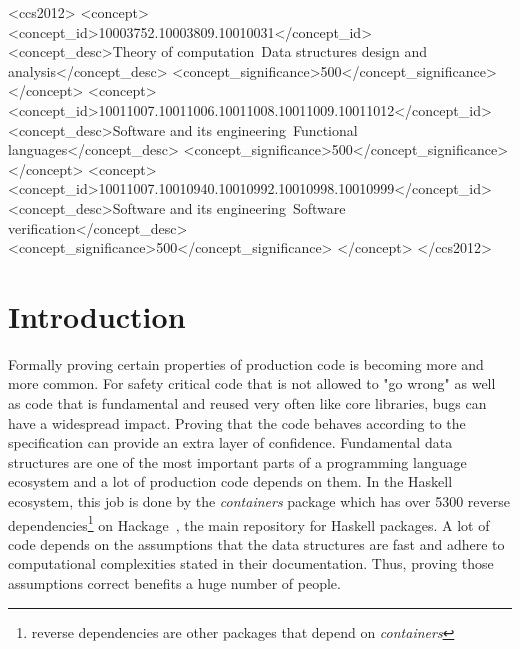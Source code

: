 \documentclass[sigplan,screen,review,anonymous]{acmart}
\begin{document}
\begin{CCSXML}
<ccs2012>
   <concept>
       <concept_id>10003752.10003809.10010031</concept_id>
       <concept_desc>Theory of computation~Data structures design and analysis</concept_desc>
       <concept_significance>500</concept_significance>
       </concept>
   <concept>
       <concept_id>10011007.10011006.10011008.10011009.10011012</concept_id>
       <concept_desc>Software and its engineering~Functional languages</concept_desc>
       <concept_significance>500</concept_significance>
       </concept>
   <concept>
       <concept_id>10011007.10010940.10010992.10010998.10010999</concept_id>
       <concept_desc>Software and its engineering~Software verification</concept_desc>
       <concept_significance>500</concept_significance>
       </concept>
 </ccs2012>
\end{CCSXML}



\maketitle

\section{Introduction}

Formally proving certain properties of production code is becoming more and more common. For safety critical code that is not allowed to "go wrong" as well as code that is fundamental and reused very often like core libraries, bugs can have a widespread impact. Proving that the code behaves according to the specification can provide an extra layer of confidence. Fundamental data structures are one of the most important parts of a programming language ecosystem and a lot of production code depends on them. In the Haskell ecosystem, this job is done by the \textit{containers} package which has over 5300 reverse dependencies\footnote{reverse dependencies are other packages that depend on \textit{containers}} on Hackage~\cite{hackage}, the main repository for Haskell packages. A lot of code depends on the assumptions that the data structures are fast and adhere to computational complexities stated in their documentation. Thus, proving those assumptions correct benefits a huge number of people.
\end{document}
